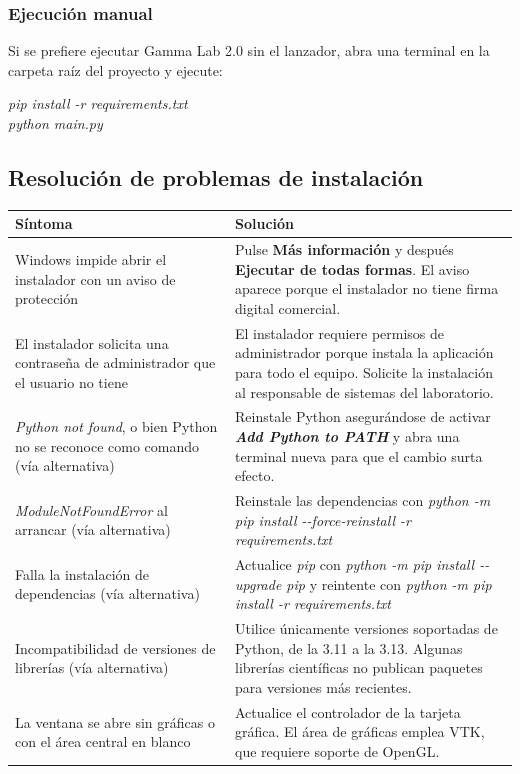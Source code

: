 \documentclass[11pt,a4paper]{article}
\begin{document}
    \subsubsection{Ejecuci\'on manual}
    Si se prefiere ejecutar Gamma Lab 2.0 sin el lanzador, abra una terminal en la carpeta ra\'iz del proyecto y ejecute:

    \begin{center}
    \textit{pip install -r requirements.txt}\\
    \textit{python main.py}
    \end{center}

    \subsection{Resoluci\'on de problemas de instalaci\'on}

    \begin{center}
    \small
    \begin{tabularx}{\textwidth}{|p{}|X|}
    \hline
    \textbf{S\'intoma} & \textbf{Soluci\'on} \\
    \hline
    Windows impide abrir el instalador con un aviso de protecci\'on & Pulse \textbf{M\'as informaci\'on} y despu\'es \textbf{Ejecutar de todas formas}. El aviso aparece porque el instalador no tiene firma digital comercial. \\
    \hline
    El instalador solicita una contrase\~na de administrador que el usuario no tiene & El instalador requiere permisos de administrador porque instala la aplicaci\'on para todo el equipo. Solicite la instalaci\'on al responsable de sistemas del laboratorio. \\
    \hline
    \textit{Python not found}, o bien Python no se reconoce como comando (v\'ia alternativa) & Reinstale Python asegur\'andose de activar \textbf{\textit{Add Python to PATH}} y abra una terminal nueva para que el cambio surta efecto. \\
    \hline
    \textit{ModuleNotFoundError} al arrancar (v\'ia alternativa) & Reinstale las dependencias con \textit{python -m pip install -{}-force-reinstall -r requirements.txt} \\
    \hline
    Falla la instalaci\'on de dependencias (v\'ia alternativa) & Actualice \textit{pip} con \textit{python -m pip install -{}-upgrade pip} y reintente con \textit{python -m pip install -r requirements.txt} \\
    \hline
    Incompatibilidad de versiones de librer\'ias (v\'ia alternativa) & Utilice \'unicamente versiones soportadas de Python, de la 3.11 a la 3.13. Algunas librer\'ias cient\'ificas no publican paquetes para versiones m\'as recientes. \\
    \hline
    La ventana se abre sin gr\'aficas o con el \'area central en blanco & Actualice el controlador de la tarjeta gr\'afica. El \'area de gr\'aficas emplea VTK, que requiere soporte de OpenGL. \\
    \hline
    \end{tabularx}
    \label{tab:mu_problemas_instalacion}
    \end{center}
\end{document}
